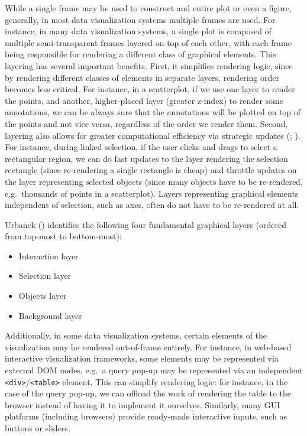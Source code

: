 \documentclass[
  openany]{book}
\providecommand{\tightlist}{%
  \setlength{\itemsep}{0pt}\setlength{\parskip}{0pt}}
\theoremstyle{definition}
\theoremstyle{definition}
\theoremstyle{definition}
\theoremstyle{definition}
\theoremstyle{remark}
\begin{document}
While a single frame may be used to construct and entire plot or even a figure, generally, in most data visualization systems multiple frames are used. For instance, in many data visualization systems, a single plot is composed of multiple semi-transparent frames layered on top of each other, with each frame being responsible for rendering a different class of graphical elements. This layering has several important benefits. First, it simplifies rendering logic, since by rendering different classes of elements in separate layers, rendering order becomes less critical. For instance, in a scatterplot, if we use one layer to render the points, and another, higher-placed layer (greater z-index) to render some annotations, we can be always sure that the annotations will be plotted on top of the points and not vice versa, regardless of the order we render them. Second, layering also allows for greater computational efficiency via strategic updates (; ). For instance, during linked selection, if the user clicks and drags to select a rectangular region, we can do fast updates to the layer rendering the selection rectangle (since re-rendering a single rectangle is cheap) and throttle updates on the layer representing selected objects (since many objects have to be re-rendered, e.g.~thousands of points in a scatterplot). Layers representing graphical elements independent of selection, such as axes, often do not have to be re-rendered at all.

Urbanek () identifies the following four fundamental graphical layers (ordered from top-most to bottom-most):

\begin{itemize}
\tightlist
\item
  Interaction layer
\item
  Selection layer
\item
  Objects layer
\item
  Background layer
\end{itemize}

Additionally, in some data visualization systems, certain elements of the visualization may be rendered out-of-frame entirely. For instance, in web-based interactive visualization frameworks, some elements may be represented via external DOM nodes, e.g.~a query pop-up may be represented via an independent \texttt{\textless{}div\textgreater{}}/\texttt{\textless{}table\textgreater{}} element. This can simplify rendering logic: for instance, in the case of the query pop-up, we can offload the work of rendering the table to the browser instead of having it to implement it ourselves. Similarly, many GUI platforms (including browsers) provide ready-made interactive inputs, such as buttons or sliders.
\end{document}
